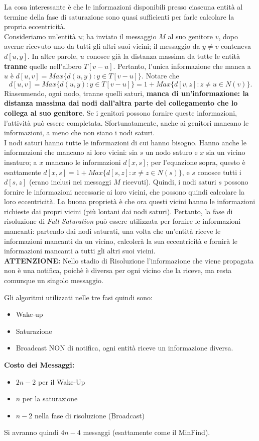 La cosa interessante è che le informazioni disponibili presso ciascuna entità al termine della fase di saturazione sono quasi sufficienti per farle calcolare la propria eccentricità.\\
Consideriamo un'entità $u$; ha inviato il messaggio $M$ al suo genitore $v$, dopo averne ricevuto uno da tutti gli altri suoi vicini; il messaggio da $y \neq v$ conteneva $d[u, y]$. In altre parole, $u$ conosce già la distanza massima da tutte le entità \textbf{tranne} quelle nell'albero $T[v - u]$. Pertanto, l'unica informazione che manca a $u$ è $d[u, v] = Max\{d(u, y) : y \in T[v - u]\}$. Notare che 
$$
d[u, v] = Max\{d(u, y) : y \in T [v - u]\} = 1 + Max\{d[v, z] : z \neq u \in N (v)\}.
$$
Riassumendo, ogni nodo, tranne quelli saturi, \textbf{manca di un'informazione: la distanza massima dai nodi dall'altra parte del collegamento che lo collega al suo genitore}. Se i genitori possono fornire queste informazioni, l'attività può essere completata. Sfortunatamente, anche ai genitori mancano le informazioni, a meno che non siano i nodi saturi.\\
I nodi saturi hanno tutte le informazioni di cui hanno bisogno. Hanno anche le informazioni che mancano ai loro vicini: sia $s$ un nodo saturo e $x$ sia un vicino insaturo; a $x$ mancano le informazioni $d[x, s]$; per l'equazione sopra, questo è esattamente $d[x, s] = 1 + Max\{d[s, z] : x \neq z \in N(s)\}$, e $s$ conosce tutti i $d[s, z]$ (erano inclusi nei messaggi $M$ ricevuti). Quindi, i nodi saturi $s$ possono fornire le informazioni necessarie ai loro vicini, che possono quindi calcolare la loro eccentricità. La buona proprietà è che ora questi vicini hanno le informazioni richieste dai propri vicini (più lontani dai nodi saturi). Pertanto, la fase di risoluzione di \textit{Full Saturation} può essere utilizzata per fornire le informazioni mancanti: partendo dai nodi saturati, una volta che un'entità riceve le informazioni mancanti da un vicino, calcolerà la sua eccentricità e fornirà le informazioni mancanti a tutti gli altri suoi vicini.\\

\textbf{ATTENZIONE:} Nello stadio di Risoluzione l'informazione che viene propagata non è una notifica, poichè è diversa per ogni vicino che la riceve, ma resta comunque un singolo messaggio.

Gli algoritmi utilizzati nelle tre fasi quindi sono:
\begin{itemize}
    \item Wake-up
    \item Saturazione
    \item Broadcast NON di notifica, ogni entità riceve un informazione diversa.
\end{itemize}
\textbf{Costo dei Messaggi:}
\begin{itemize}
    \item $2n-2$ per il Wake-Up
    \item $n$ per la saturazione
    \item $n-2$ nella fase di risoluzione (Broadcast)
\end{itemize}
Si avranno quindi $4n-4$ messaggi (esattamente come il MinFind).

